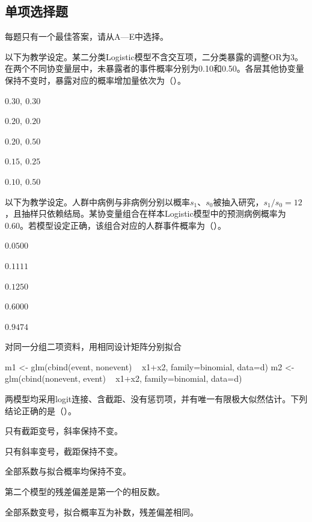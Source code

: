 \subsection{单项选择题}
每题只有一个最佳答案，请从A—E中选择。

\par\noindent\begin{minipage}{\linewidth}
以下为教学设定。某二分类Logistic模型不含交互项，二分类暴露的调整OR为3。在两个不同协变量层中，未暴露者的事件概率分别为0.10和0.50。各层其他协变量保持不变时，暴露对应的概率增加量依次为（\quad）。
\begin{choices}
\item $0.30,\ 0.30$
\item $0.20,\ 0.20$
\item $0.20,\ 0.50$
\item $0.15,\ 0.25$
\item $0.10,\ 0.50$
\end{choices}
\end{minipage}\par\medskip

\par\noindent\begin{minipage}{\linewidth}
以下为教学设定。人群中病例与非病例分别以概率$s_1$、$s_0$被抽入研究，$s_1/s_0=12$，且抽样只依赖结局。某协变量组合在样本Logistic模型中的预测病例概率为0.60。若模型设定正确，该组合对应的人群事件概率为（\quad）。
\begin{choices}
\item $0.0500$
\item $0.1111$
\item $0.1250$
\item $0.6000$
\item $0.9474$
\end{choices}
\end{minipage}\par\medskip

\par\noindent\begin{minipage}{\linewidth}
对同一分组二项资料，用相同设计矩阵分别拟合
\begin{rcode}
m1 <- glm(cbind(event, nonevent) ~ x1+x2,
          family=binomial, data=d)
m2 <- glm(cbind(nonevent, event) ~ x1+x2,
          family=binomial, data=d)
\end{rcode}
两模型均采用logit连接、含截距、没有惩罚项，并有唯一有限极大似然估计。下列结论正确的是（\quad）。
\begin{choices}
\item 只有截距变号，斜率保持不变。
\item 只有斜率变号，截距保持不变。
\item 全部系数与拟合概率均保持不变。
\item 第二个模型的残差偏差是第一个的相反数。
\item 全部系数变号，拟合概率互为补数，残差偏差相同。
\end{choices}
\end{minipage}\par\medskip

